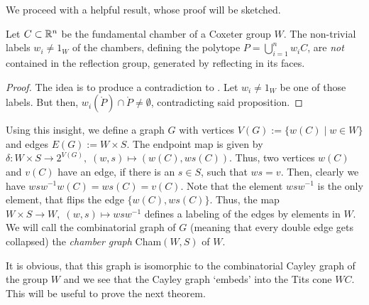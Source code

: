 We proceed with a helpful result, whose proof will be sketched.

\begin{lemma}
    Let \(C \subset \mathbb{R}^n\) be the fundamental chamber of a Coxeter group \(W\).
    The non-trivial labels \(w_i \neq 1_W\) of the chambers, defining the polytope \(P = \bigcup_{i=1}^n w_i C\), are \emph{not} contained in the reflection group, generated by reflecting in its faces.
\end{lemma}
\begin{proof}
    The idea is to produce a contradiction to . \newline
    Let \(w_i \neq 1_W\) be one of those labels.
    But then, \(w_i(\mathring{P}) \cap \mathring{P} \neq \emptyset\), contradicting said proposition.
\end{proof}

Using this insight, we define a graph \(G\) with vertices \(V(G) := \{w(C) \;\vert\; w \in W\}\) and edges \(E(G) := W \times S\).
The endpoint map is given by \(\delta : W \times S \to 2^{V(G)},\; (w, s) \mapsto (w(C), ws(C))\).
Thus, two vertices \(w(C)\) and \(v(C)\) have an edge, if there is an \(s \in S\), such that \(ws = v\).
Then, clearly we have \(wsw^{-1}w(C) = ws(C) = v(C)\).
Note that the element \(wsw^{-1}\) is the only element, that flips the edge \(\{w(C), ws(C)\}\).
Thus, the map \(W \times S \to W, \; (w, s) \mapsto wsw^{-1}\) defines a labeling of the edges by elements in \(W\).
We will call the combinatorial graph of \(G\) (meaning that every double edge gets collapsed) the \emph{chamber graph} Cham\((W, S)\) of \(W\).

It is obvious, that this graph is isomorphic to the combinatorial Cayley graph of the group \(W\) and we see that the Cayley graph `embeds' into the Tits cone \(WC\).
This will be useful to prove the next theorem.

